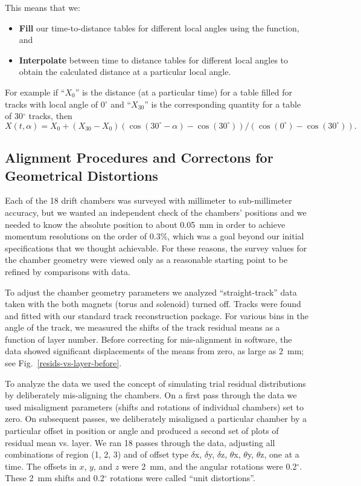 This means that we:
\begin{itemize}
\item {\bf Fill} our time-to-distance tables for different local angles using the function, and
\item {\bf Interpolate} between time to distance tables for different local angles to obtain
the calculated distance at a particular local angle.
\end{itemize}
For example if ``$X_0$'' is the distance (at a particular time) for a table filled for tracks with local
angle of 0$^\circ$ and ``$X_{30}$'' is the corresponding quantity for a table of 30$^\circ$ tracks, then
\begin{equation} 
\label{eq-extrap30}
X(t,\alpha) = X_0 + (X_{30}-X_0) (\cos(30^\circ-\alpha) - \cos(30^\circ)) / (\cos(0^\circ) - \cos(30^\circ)).
\end{equation}

\subsection{Alignment Procedures and Correctons for Geometrical Distortions}
\label{align}

Each of the 18 drift chambers was surveyed with millimeter to sub-millimeter
accuracy, but we wanted an independent check of the chambers' positions and 
we needed to know the absolute position to about 0.05~mm in order to 
achieve momentum resolutions on the order of 0.3\%, which was a goal beyond
our initial specifications that we thought achievable.  For 
these reasons, the survey values for the chamber geometry were viewed only as 
a reasonable starting point to be refined by comparisons with data.

To adjust the chamber geometry parameters we analyzed
``straight-track'' data taken with the both magnets (torus and solenoid) turned off.  
Tracks were found and fitted with our standard track reconstruction package.
For various bins in the angle of the track, we measured the shifts of the
track residual means as a function of layer number. 
Before correcting for mis-alignment in software, the data showed significant 
displacements of the means from zero, as large as 2~mm; see Fig.~\ref{resids-vs-layer-before}.

To analyze the data we used the concept of simulating trial residual
distributions by deliberately mis-aligning the chambers.
On a first pass through
the data we used misaligment parameters (shifts and rotations of individual
chambers) set to zero.  On subsequent passes, we deliberately misaligned
a particular chamber by a particular offset in position or angle and 
produced a second set of plots of residual mean vs. layer.  We ran 18 passes
through the data, adjusting all combinations of region (1, 2, 3) and
of offset type $\delta$x, $\delta$y, $\delta$z, $\theta$x, 
$\theta$y, $\theta$z, one at
a time.  The offsets in $x$, $y$, and $z$ were 2~mm, and the angular rotations
were 0.2$^\circ$.  These 2~mm shifts and 0.2$^\circ$ rotations were
called ``unit distortions''.

